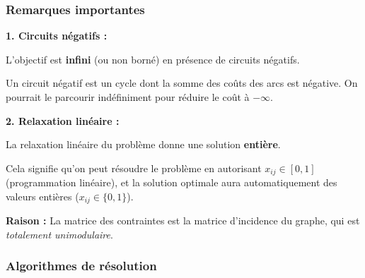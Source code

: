 \documentclass[12pt,a4paper]{article}
\begin{document}
\subsubsection{Remarques importantes}

\begin{important}
\textbf{1. Circuits négatifs :}

L'objectif est \textcolor{importantrouge}{\textbf{infini}} (ou non borné) en présence de circuits négatifs.

Un circuit négatif est un cycle dont la somme des coûts des arcs est négative. On pourrait le parcourir indéfiniment pour réduire le coût à $-\infty$.

\textbf{2. Relaxation linéaire :}

La relaxation linéaire du problème donne une solution \textcolor{defvert}{\textbf{entière}}.

Cela signifie qu'on peut résoudre le problème en autorisant $x_{ij} \in [0,1]$ (programmation linéaire), et la solution optimale aura automatiquement des valeurs entières ($x_{ij} \in \{0,1\}$).

\textbf{Raison :} La matrice des contraintes est la matrice d'incidence du graphe, qui est \textit{totalement unimodulaire}.
\end{important}

\subsubsection{Algorithmes de résolution}
\end{document}

